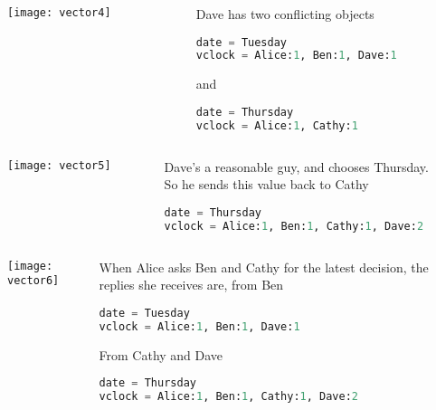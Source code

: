 \documentclass[aspectratio=169, 15pt,usenames,dvipsnames]{beamer}
\begin{document}
	\cprotEnv\begin{gdblank}
	\begin{columns}
		\begin{column}{0.5\textwidth}
			\texttt{[image: vector4]}			
		\end{column}
		\begin{column}{0.5\textwidth}				
			Dave has two conflicting objects
			\begin{lstlisting}[language=Python]
date = Tuesday
vclock = Alice:1, Ben:1, Dave:1
			\end{lstlisting}
			and
			\begin{lstlisting}[language=Python]
date = Thursday
vclock = Alice:1, Cathy:1
			\end{lstlisting}
		\end{column}	
	\end{columns} 
	\end{gdblank}
	\cprotEnv\begin{gdblank}
	\begin{columns}
		\begin{column}{0.5\textwidth}
			\texttt{[image: vector5]}			
		\end{column}
		\begin{column}{0.5\textwidth}				
			Dave’s a reasonable guy, and chooses Thursday.\\So he sends this value back to Cathy
			\begin{lstlisting}[language=Python]
date = Thursday
vclock = Alice:1, Ben:1, Cathy:1, Dave:2
			\end{lstlisting}
		\end{column}	
	\end{columns} 
	\end{gdblank}
	\cprotEnv\begin{gdblank}
	\begin{columns}
		\begin{column}{0.5\textwidth}
			\texttt{[image: vector6]}			
		\end{column}
		\begin{column}{0.5\textwidth}				
			When Alice asks Ben and Cathy for the latest decision, the replies she receives are, from Ben
			\begin{lstlisting}[language=Python]
date = Tuesday
vclock = Alice:1, Ben:1, Dave:1
			\end{lstlisting}
			From Cathy and Dave
			\begin{lstlisting}[language=Python]
date = Thursday
vclock = Alice:1, Ben:1, Cathy:1, Dave:2
			\end{lstlisting}
		\end{column}	
	\end{columns} 
	\end{gdblank}
\end{document}
